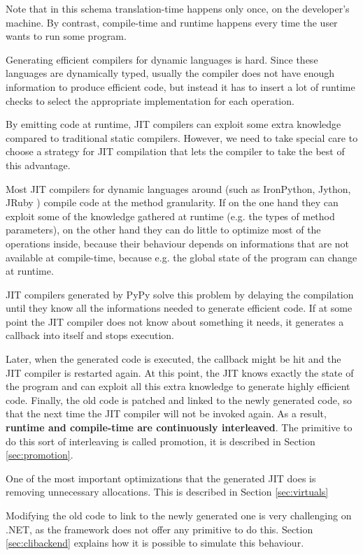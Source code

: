 Note that in this schema translation-time happens only once, on the
developer's machine.  By contrast, compile-time and runtime happens every time
the user wants to run some program.

Generating efficient compilers for dynamic languages is hard.  Since these
languages are dynamically typed, usually the compiler does not have enough
information to produce efficient code, but instead it has to insert a lot of
runtime checks to select the appropriate implementation for each operation.

By emitting code at runtime, JIT compilers can exploit some extra knowledge
compared to traditional static compilers.  However, we need to take special
care to choose a strategy for JIT compilation that lets the compiler to take
the best of this advantage.

Most JIT compilers for dynamic languages around (such as IronPython, Jython,
JRuby ) compile code at the method
granularity.  If on the one hand they can exploit some of the knowledge gathered
at runtime (e.g. the types of method parameters), on the other hand they can
do little to optimize most of the operations inside, because their behaviour
depends on informations that are not available at compile-time, because
e.g. the global state of the program can change at runtime. 

JIT compilers generated by PyPy solve this problem by delaying the compilation
until they know all the informations needed to generate efficient code.  If at
some point the JIT compiler does not know about something it needs, it
generates a callback into itself and stops execution.  

Later, when the generated code is executed, the callback might be hit and the JIT
compiler is restarted again.  At this point, the JIT knows exactly the state
of the program and can exploit all this extra knowledge to generate highly
efficient code.  Finally, the old code is patched and linked to the newly
generated code, so that the next time the JIT compiler will not be invoked
again.  As a result, \textbf{runtime and compile-time are continuously
interleaved}. The primitive to do this sort of interleaving is called promotion,
it is described in Section \ref{sec:promotion}.

One of the most important optimizations that the generated JIT does is removing
unnecessary allocations. This is described in Section \ref{sec:virtuals}

Modifying the old code to link to the newly generated one is very challenging on
.NET, as the framework does not offer any primitive to do this.  Section
\ref{sec:clibackend} explains how it is possible to simulate this behaviour.
